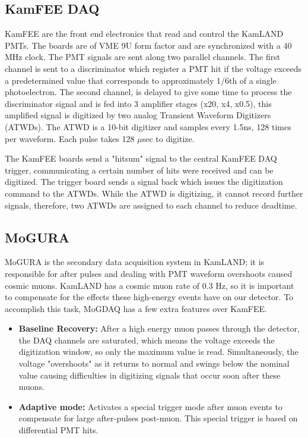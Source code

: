 \subsection{KamFEE DAQ}
KamFEE are the front end electronics that read and control the KamLAND PMTs. The boards are of VME 9U form factor and are synchronized with a 40 MHz clock. The PMT signals are sent along two parallel channels. The first channel is sent to a discriminator which register a PMT hit if the voltage exceeds a predetermined value that corresponds to approximately 1/6th of a single photoelectron. The second channel, is delayed to give some time to process the discriminator signal and is fed into 3 amplifier stages (x20, x4, x0.5), this amplified signal is digitized by two analog Transient Waveform Digitizers (ATWDs). The ATWD is a 10-bit digitizer and samples every 1.5ns, 128 times per waveform. Each pulse takes 128 $\mu$sec to digitize.

The KamFEE boards send a "hitsum" signal to the central KamFEE DAQ trigger, communicating a certain number of hits were received and can be digitized. The trigger board sends a signal back which issues the digitization command to the ATWDs. While the ATWD is digitizing, it cannot record further signals, therefore, two ATWDs are assigned to each channel to reduce deadtime.

\subsection{MoGURA}
MoGURA is the secondary data acquisition system in KamLAND; it is responsible for after pulses and dealing with PMT waveform overshoots caused cosmic muons. KamLAND has a cosmic muon rate of 0.3 Hz, so it is important to compensate for the effects these high-energy events have on our detector. To accomplish this task, MoGDAQ has a few extra features over KamFEE.
\begin{itemize}
	\item \textbf{Baseline Recovery:} After a high energy muon passes through the detector, the DAQ channels are saturated, which means the voltage exceeds the digitization window, so only the maximum value is read. Simultaneously, the voltage "overshoots" as it returns to normal and swings below the nominal value causing difficulties in digitizing signals that occur soon after these muons. 
	\item \textbf{Adaptive mode:} Activates a special trigger mode after muon events to compensate for large after-pulses post-muon. This special trigger is based on differential PMT hits. 
\end{itemize}

